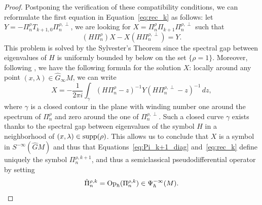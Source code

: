 \documentclass[12pt,a4paper]{amsart}
\theoremstyle{plain}
\theoremstyle{definition}
\theoremstyle{remark}
\numberwithin{equation}{section}
\theoremstyle{definition}
\def \Op{{\rm Op}}
\def \supp {{\rm supp}}
\def \Ghat{\widehat{G}}
\numberwithin{equation}{section}
\begin{document}
\begin{proof}
    Postponing the verification of these compatibility conditions, we can reformulate the first equation in Equation~\eqref{eq:rec_k} as follows: let $Y = -\Pi_n^{\rho} 
    T_{k+1,0}\Pi_n^{\rho,\perp}$, we are looking for $X = \Pi_n^{\rho} \Pi_{k+1}\Pi_n^{\rho,\perp}$ such that
    \begin{equation*}
        (H\Pi_n^{\rho}) X - X (H \Pi_n^{\rho,\perp}) = Y.
    \end{equation*}
    This problem is solved by the Sylvester’s Theorem since the spectral gap between eigenvalues of $H$ is uniformly bounded by below on the set $\{\rho = 1\}$. Moreover, following \cite[Theorem A.1]{BFKRV}, we have the following formula for the solution $X$: locally around any point $(x,\lambda)\in \Ghat_\infty M$, we can write
    \begin{equation*}
        X = -\frac{1}{2\pi i} \int_\gamma (H\Pi_n^\rho-z)^{-1} Y(H\Pi_n^{\rho,\perp}-z)^{-1} \,dz,
    \end{equation*}
    where $\gamma$ is a closed contour in the plane with winding number one around the spectrum of $\Pi_n^\rho$ and zero around the one of $\Pi_n^{\rho,\perp}$. Such a closed curve $\gamma$ exists thanks to the spectral gap between eigenvalues of the symbol $H$ in a neighborhood of $(x,\lambda)\in \supp(\rho)$. This allows us to conclude that $X$ is a symbol in $S^{-\infty}(\Ghat M)$ and thus that Equations~\eqref{eq:Pi_k+1_diag} and~\eqref{eq:rec_k} define uniquely the symbol $\Pi_n^{\rho,k+1}$, and thus a semiclassical pseudodifferential operator by setting
    \begin{equation*}
        \hat{\Pi}_n^{\rho,k} = \Op_\hbar(\Pi_n^{\rho,k})\in\Psi_\hbar^{-\infty}(M).
    \end{equation*}


\end{proof}
\end{document}
